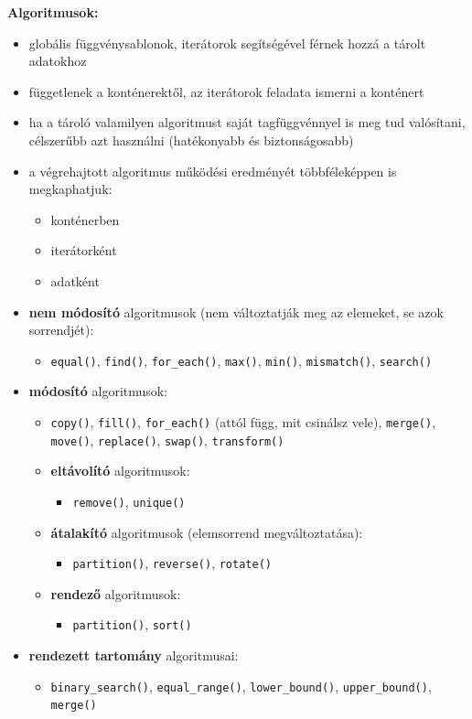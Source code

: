 \textbf{Algoritmusok:}
\begin{itemize}
    \item globális függvénysablonok, iterátorok segítségével férnek hozzá a tárolt adatokhoz
    \item függetlenek a konténerektől, az iterátorok feladata ismerni a konténert
    \item ha a tároló valamilyen algoritmust saját tagfüggvénnyel is meg tud valósítani, célszerűbb azt használni (hatékonyabb és biztonságosabb)
    \item a végrehajtott algoritmus működési eredményét többféleképpen is megkaphatjuk:
    \begin{itemize}
        \item konténerben
        \item iterátorként
        \item adatként
    \end{itemize}
    \item \textbf{nem módosító} algoritmusok (nem változtatják meg az elemeket, se azok sorrendjét):
    \begin{itemize}
        \item \texttt{equal()}, \texttt{find()}, \texttt{for\_each()}, \texttt{max()}, \texttt{min()}, \texttt{mismatch()}, \texttt{search()}
    \end{itemize}
    \item \textbf{módosító} algoritmusok:
    \begin{itemize}
        \item \texttt{copy()}, \texttt{fill()}, \texttt{for\_each()} (attól függ, mit csinálsz vele), \texttt{merge()}, \texttt{move()}, \texttt{replace()}, \texttt{swap()}, \texttt{transform()}
        \item \textbf{eltávolító} algoritmusok:
        \begin{itemize}
            \item \texttt{remove()}, \texttt{unique()}
        \end{itemize}
        \item \textbf{átalakító} algoritmusok (elemsorrend megváltoztatása):
        \begin{itemize}
            \item \texttt{partition()}, \texttt{reverse()}, \texttt{rotate()}
        \end{itemize}
        \item \textbf{rendező} algoritmusok:
        \begin{itemize}
            \item \texttt{partition()}, \texttt{sort()} 
        \end{itemize}
    \end{itemize}
    \item \textbf{rendezett tartomány} algoritmusai:
    \begin{itemize}
        \item \texttt{binary\_search()}, \texttt{equal\_range()}, \texttt{lower\_bound()}, \texttt{upper\_bound()}, \texttt{merge()}
    \end{itemize}
\end{itemize}

